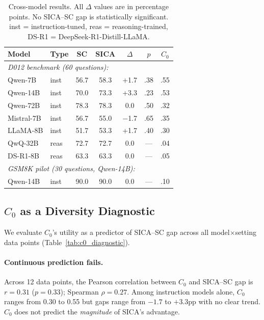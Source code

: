 \documentclass[11pt,a4paper]{article}
\begin{document}
\begin{table}[t]
\centering
\small
\setlength{\tabcolsep}{3.5pt}
\begin{tabular}{llccccc}
\toprule
\textbf{Model} & \textbf{Type} & \textbf{SC} & \textbf{SICA} & \textbf{$\Delta$} & \textbf{$p$} & $C_0$ \\
\midrule
\multicolumn{7}{l}{\emph{D012 benchmark (60 questions):}} \\
Qwen-7B & inst & 56.7 & 58.3 & +1.7 & .38 & .55 \\
Qwen-14B & inst & 70.0 & 73.3 & +3.3 & .23 & .53 \\
Qwen-72B & inst & 78.3 & 78.3 & 0.0 & .50 & .32 \\
Mistral-7B & inst & 56.7 & 55.0 & $-$1.7 & .65 & .35 \\
LLaMA-8B & inst & 51.7 & 53.3 & +1.7 & .40 & .30 \\
\hdashline
QwQ-32B & reas & 72.7 & 72.7 & 0.0 & --- & .04 \\
DS-R1-8B & reas & 63.3 & 63.3 & 0.0 & --- & .05 \\
\midrule
\multicolumn{7}{l}{\emph{GSM8K pilot (30 questions, Qwen-14B):}} \\
Qwen-14B & inst & 90.0 & 90.0 & 0.0 & --- & .10 \\
\bottomrule
\end{tabular}
\caption{Cross-model results. All $\Delta$ values are in percentage points. No SICA--SC gap is statistically significant. inst = instruction-tuned, reas = reasoning-trained, DS-R1 = DeepSeek-R1-Distill-LLaMA.}
\label{tab:cross_model}
\end{table}

\subsection{$C_0$ as a Diversity Diagnostic}
\label{sec:c0_diagnostic}

We evaluate $C_0$'s utility as a predictor of SICA--SC gap across all model$\times$setting data points (Table~\ref{tab:c0_diagnostic}).

\paragraph{Continuous prediction fails.}
Across 12 data points, the Pearson correlation between $C_0$ and SICA--SC gap is $r=0.31$ ($p=0.33$); Spearman $\rho=0.27$.
Among instruction models alone, $C_0$ ranges from 0.30 to 0.55 but gaps range from $-1.7$ to $+3.3$pp with no clear trend.
$C_0$ does not predict the \emph{magnitude} of SICA's advantage.
\end{document}
